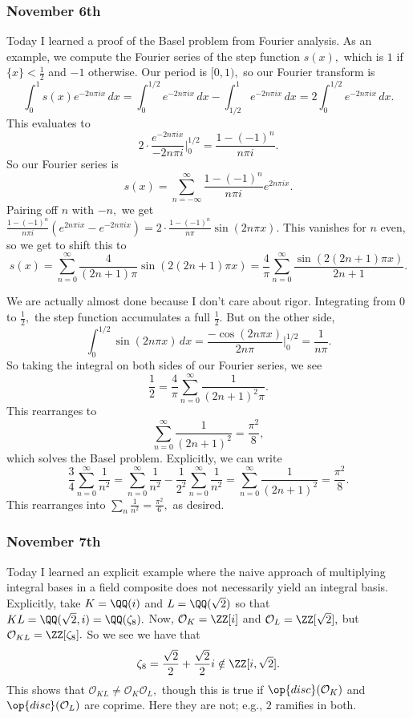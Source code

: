 \subsubsection{November 6th}
Today I learned a proof of the Basel problem from Fourier analysis. As an example, we compute the Fourier series of the step function $s(x),$ which is $1$ if $\{x\}<\frac12$ and $-1$ otherwise. Our period is $[0,1),$ so our Fourier transform is
\[\int_0^1s(x)e^{-2n\pi ix}\,dx=\int_0^{1/2}e^{-2n\pi ix}\,dx-\int_{1/2}^1e^{-2n\pi ix}\,dx=2\int_0^{1/2}e^{-2n\pi ix}\,dx.\]
This evaluates to
\[2\cdot\frac{e^{-2n\pi ix}}{-2n\pi i}\bigg|_0^{1/2}=\frac{1-(-1)^n}{n\pi i}.\]
So our Fourier series is
\[s(x)=\sum_{n=-\infty}^\infty\frac{1-(-1)^n}{n\pi i}e^{2n\pi ix}.\]
Pairing off $n$ with $-n,$ we get $\frac{1-(-1)^n}{n\pi i}\left(e^{2n\pi ix}-e^{-2n\pi ix}\right)=2\cdot\frac{1-(-1)^n}{n\pi}\sin(2n\pi x).$ This vanishes for $n$ even, so we get to shift this to
\[s(x)=\sum_{n=0}^\infty\frac4{(2n+1)\pi}\sin(2(2n+1)\pi x)=\frac4\pi\sum_{n=0}^\infty\frac{\sin(2(2n+1)\pi x)}{2n+1}.\]

We are actually almost done because I don't care about rigor. Integrating from $0$ to $\frac12,$ the step function accumulates a full $\frac12.$ But on the other side,
\[\int_0^{1/2}\sin(2n\pi x)\,dx=\frac{-\cos(2n\pi x)}{2n\pi}\bigg|_0^{1/2}=\frac1{n\pi}.\]
So taking the integral on both sides of our Fourier series, we see
\[\frac12=\frac4\pi\sum_{n=0}^\infty\frac1{(2n+1)^2\pi}.\]
This rearranges to
\[\sum_{n=0}^\infty\frac1{(2n+1)^2}=\frac{\pi^2}8,\]
which solves the Basel problem. Explicitly, we can write
\[\frac34\sum_{n=0}^\infty\frac1{n^2}=\sum_{n=0}^\infty\frac1{n^2}-\frac1{2^2}\sum_{n=0}^\infty\frac1{n^2}=\sum_{n=0}^\infty\frac1{(2n+1)^2}=\frac{\pi^2}8.\]
This rearranges into $\sum_n\frac1{n^2}=\frac{\pi^2}6,$ as desired.

\subsubsection{November 7th}
Today I learned an explicit example where the naive approach of multiplying integral bases in a field composite does not necessarily yield an integral basis. Explicitly, take $K=\QQ(i)$ and $L=\QQ(\sqrt2)$ so that $KL=\QQ(\sqrt2,i)=\QQ(\zeta_8).$ Now, $\mathcal O_K=\ZZ[i]$ and $\mathcal O_L=\ZZ[\sqrt2],$ but $\mathcal O_{KL}=\ZZ[\zeta_8].$ So we see we have that
\[\zeta_8=\frac{\sqrt2}2+\frac{\sqrt2}2i\notin\ZZ[i,\sqrt2].\]
This shows that $\mathcal O_{KL}\ne\mathcal O_K\mathcal O_L,$ though this is true if $\op{disc}(\mathcal O_K)$ and $\op{disc}(\mathcal O_L)$ are coprime. Here they are not; e.g., $2$ ramifies in both.

